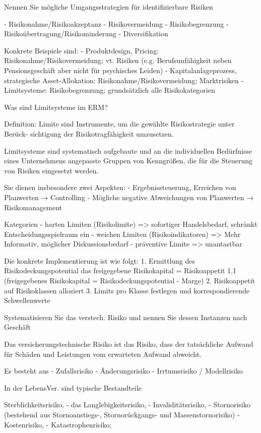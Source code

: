 Nennen Sie mögliche Umgangsstrategien für identifizierbare Risiken

- Risikonahme/Risikoakzeptanz
- Risikovermeidung
- Risikobegrenzung
- Risikoübertragung/Risikominderung
- Diversifikation

Konkrete Beispiele sind:
- Produktdesign, Pricing: Risikonahme/Risikovermeidung; vt. Risiken (e.g. Berufsunfähigkeit neben Pensionsgeschäft aber nicht für psychisches Leiden)
- Kapitalanlageprozess, strategische Asset-Allokation: Risikonahme/Risikovermeidung;
Marktrisiken
- Limitsysteme: Risikobegrenzung; grundsätzlich alle Risikokategorien


Was sind Limitsysteme im ERM?

Definition: Limite sind Instrumente, um die gewählte Risikostrategie unter Berück-
sichtigung der Risikotragfähigkeit umzusetzen.

Limitsysteme sind systematisch aufgebaute und an die individuellen Bedürfnisse
eines Unternehmens angepasste Gruppen von Kenngrößen, die für die Steuerung
von Risiken eingesetzt werden.

Sie dienen insbesondere zwei Aspekten:
- Ergebnissteuerung, Erreichen von Planwerten → Controlling
- Mögliche negative Abweichungen von Planwerten → Risikomanagement


Kategorien
- harten Limiten (Risikolimite) => sofortiger Handelsbedarf, schränkt Entscheidungsspielraum ein
- weichen Limiten (Risikoindikatoren) => Mehr Informativ, möglicher Diskussionsbedarf
- präventive Limite => unantastbar


Die konkrete Implementierung ist wie folgt:
1. Ermittlung des Risikodeckungspotential das freigegebene Risikokapital = Risikoappetit
1.1 (freigegebenes Risikokapital = Risikodeckungspotential - Marge)
2. Risikoappetit auf Risikoklassen alloziert
3. Limits pro Klasse festlegen und korrespondierende Schwellenwerte



Systematisieren Sie das verstech. Risiko und nennen Sie dessen Instanzen nach Geschäft

Das versicherungstechnische Risiko ist das Risiko, dass der tatsächliche Aufwand
für Schäden und Leistungen vom erwarteten Aufwand abweicht.

Es besteht aus
- Zufallsrisiko
- Änderungsrisiko 
- Irrtumsrisiko / Modellrisiko


In der LebensVer. sind typische Bestandteile

Sterblichkeitsrisiko,
- das Langlebigkeitsrisiko,
- Invaliditätsrisiko,
- Stornorisiko (bestehend aus Stornoanstiegs-, Stornorückgangs- und Massenstornorisiko)
- Kostenrisiko,
- Katastrophenrisiko;

